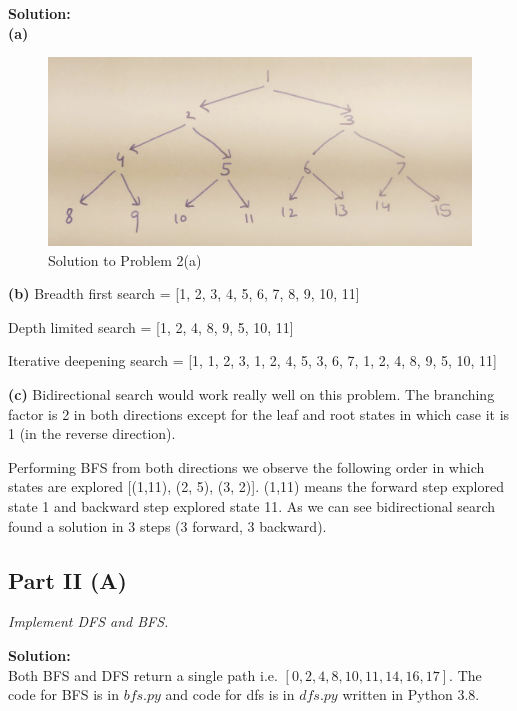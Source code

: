 \documentclass[12pt,a4paper]{article}
\newcommand{\solution}{\noindent\textbf{Solution:}\\}
\begin{document}
\solution
\noindent\textbf{(a)}
\begin{figure}[H]
    \centering
    \includegraphics[width=12cm]{prob_2_a.jpg}
    \caption{Solution to Problem 2(a)}
\end{figure}

\noindent\textbf{(b)}
Breadth first search = [1, 2, 3, 4, 5, 6, 7, 8, 9, 10, 11]

Depth limited search = [1, 2, 4, 8, 9, 5, 10, 11] 

Iterative deepening search  = [1, 1, 2, 3, 1, 2, 4, 5, 3, 6, 7, 1, 2, 4, 8, 9, 5, 10, 11]

\noindent\textbf{(c)} Bidirectional search would work really well on this problem. The branching factor is 2 in both directions except for the leaf  and root states in which case it is 1 (in the reverse direction).

Performing BFS from both directions we observe the following order in which states are explored [(1,11), (2, 5), (3, 2)]. (1,11) means the forward step explored state 1 and backward step explored state 11. As we can see bidirectional search found a solution in 3 steps (3 forward, 3 backward).

\subsection*{Part II (A)}
\textit{
    Implement DFS and BFS.
}

\solution
Both BFS and DFS return a single path i.e. $[0, 2, 4, 8, 10, 11, 14, 16, 17]$. The code for BFS is in $bfs.py$ and code for dfs is in $dfs.py$ written in Python 3.8.
\end{document}
